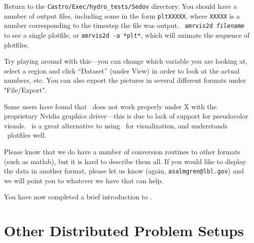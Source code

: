 \begin{enumerate}
  Return to the {\tt Castro/Exec/hydro\_tests/Sedov} directory.  You should
  have a number of output files, including some in the form {\tt *pltXXXXX},
  where {\tt XXXXX} is a number corresponding to the timestep the file
  was output.  {\tt
    amrvis2d {\em filename}} to see a single plotfile, or {\tt amrvis2d -a
  *plt*}, which will animate the sequence of plotfiles.

  Try playing
  around with this---you can change which variable you are
  looking at, select a region and click ``Dataset'' (under View)
  in order to look at the actual numbers, etc. You can also export the
  pictures in several different formats under "File/Export".

Some users have found that \amrvis\ does not work properly under X 
with the proprietary Nvidia graphics driver---this is due to lack
of support for pseudocolor visuals.  \yt\ is a great alternative
to using \amrvis\ for visualization, and understands \castro\
plotfiles well.

Please know that we do have a number of conversion routines to other
formats (such as matlab), but it is hard to describe them all. If you
would like to display the data in another format, please let us know
(again, {\tt asalmgren@lbl.gov}) and we will point you to whatever we have
that can help.

\end{enumerate}

You have now completed a brief introduction to \castro. 


\section{Other Distributed Problem Setups}

